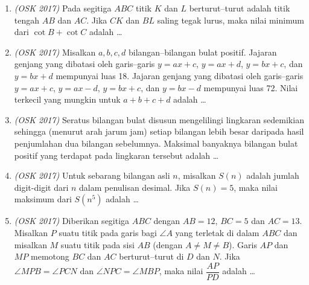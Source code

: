\documentclass[11pt]{scrartcl}
\begin{document}
\begin{enumerate}
\item \textit{(OSK 2017)} Pada segitiga $ABC$ titik $K$ dan $L$ berturut–turut adalah titik tengah $AB$ dan $AC$. Jika $CK$ dan $BL$ saling tegak lurus, maka nilai minimum dari $\cot B + \cot C$ adalah \dots

\item \textit{(OSK 2017)} Misalkan $a,b,c,d$ bilangan–bilangan bulat positif. Jajaran genjang yang dibatasi oleh garis–garis $y=ax+c$, $y=ax+d$, $y=bx+c$, dan $y=bx+d$ mempunyai luas 18. Jajaran genjang yang dibatasi oleh garis–garis $y=ax+c$, $y=ax-d$, $y=bx+c$, dan $y=bx-d$ mempunyai luas 72. Nilai terkecil yang mungkin untuk $a+b+c+d$ adalah \dots

\item \textit{(OSK 2017)} Seratus bilangan bulat disusun mengelilingi lingkaran sedemikian sehingga (menurut arah jarum jam) setiap bilangan lebih besar daripada hasil penjumlahan dua bilangan sebelumnya. Maksimal banyaknya bilangan bulat positif yang terdapat pada lingkaran tersebut adalah \dots

\item \textit{(OSK 2017)} Untuk sebarang bilangan asli $n$, misalkan $S(n)$ adalah jumlah digit-digit dari $n$ dalam penulisan desimal. Jika $S(n) = 5$, maka nilai maksimum dari $S(n^5)$ adalah \dots

\item \textit{(OSK 2017)} Diberikan segitiga $ABC$ dengan $AB = 12$, $BC = 5$ dan $AC = 13$. Misalkan $P$ suatu titik pada garis bagi $\angle A$ yang terletak di dalam $ABC$ dan misalkan $M$ suatu titik pada sisi $AB$ (dengan $A \ne M \ne B$). Garis $AP$ dan $MP$ memotong $BC$ dan $AC$ berturut–turut di $D$ dan $N$. Jika $\angle MPB = \angle PCN$ dan $\angle NPC = \angle MBP$, maka nilai $\dfrac{AP}{PD}$ adalah \dots

\end{enumerate}
\newpage
\end{document}
